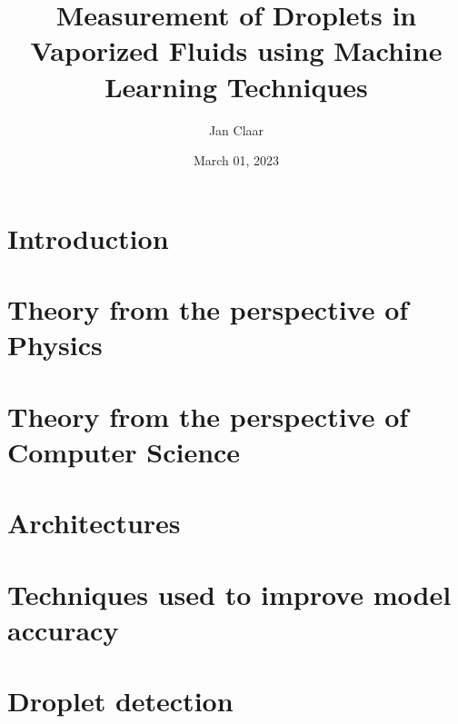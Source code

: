\documentclass[
    headings=optiontohead,              %
    12pt,                               %
    DIV=13,                             %
    twoside=false,                      %
    open=right,                         %
    BCOR=00mm,                          %
    toc=bibliographynumbered            %
]{scrreport}
\title{Measurement of Droplets in Vaporized Fluids using Machine Learning Techniques}
\author{Jan Claar}
\date{March 01, 2023}
\begin{document}
    \thispagestyle{empty} 
     
    \tableofcontents
    \thispagestyle{empty} 
    \newpage 
    \setcounter{page}{1} 
    \pagestyle{scrheadings}

    \chapter{Introduction}
    \label{sec:introduction}
    


    \chapter{Theory from the perspective of Physics}
    \label{sec:theory_physics}
    
    
    
    

    \newpage
    \chapter{Theory from the perspective of Computer Science}
    \label{sec:theory_compsci}
    
    
    
    

    \chapter{Architectures}
    \label{sec:architectures}
    
    
    

    \chapter{Techniques used to improve model accuracy}
    \label{sec:techniques}
    
    
    

    \chapter{Droplet detection}
    \label{sec:detection}
    
    
\end{document}
